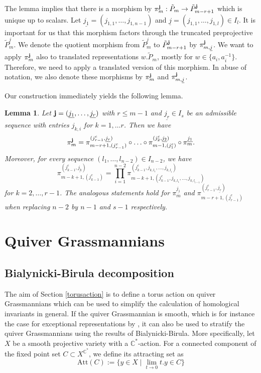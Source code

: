 \documentclass{amsart}
\newtheorem{lemma}[theorem]{Lemma}
\numberwithin{equation}{section}
\newcommand{\C}{\mathbb{C}}
\newcommand{\uj}{{\underline j}}
\begin{document}
The lemma implies that there is a morphism by $\pi_m^{\bf j}:\tilde P_m\to \tilde P_{m-r+1}^{\bf j}$ which is unique up to scalars. Let $\underline{j_1}=(j_{1,1},\ldots,j_{1,n-1})$ and $\uj=(j_{1,1},\ldots,j_{1,l})\in I_l$. It is important for us that this morphism factors through the truncated preprojective $\tilde P_m^{\uj}$. We denote the quotient morphism from $\tilde P_m^{\uj}$ to $\tilde P_{m-r+1}^{\bf j}$ by $\pi_{m,\uj}^{\bf j}$. We want to apply $\pi_m^{\bf j}$ also to translated representations $w.\tilde P_m$, mostly for $w\in\{a_i,a_i^{-1}\}$. Therefore, we need to apply a translated version of this morphism. In abuse of notation, we also denote these morphisms by $\pi_m^{\bf j}$ and $\pi_{m,\uj}^{\bf j}$.

Our construction immediately yields the following lemma.
\begin{lemma}\label{projections}
Let ${\bf j}=(\underline{j_1},\ldots,\underline{j_r})$ with $r\leq m-1$ and $\underline{j_r}\in I_s$ be an admissible sequence with entries $j_{k,i}$ for $k=1,\ldots r$. Then we have
\[\pi_m^{\bf j}=\pi_{m-r+1,(j_{r-1}^c)}^{(j_{r-1}^c,\underline{j_r})}\circ\ldots\circ\pi^{(j_{2}^c,\underline{j_2})}_{m-1,(j_1^c)}\circ\pi_m^{\underline{j_1}}.\]
Moreover, for every sequence $(l_1,\ldots,l_{n-2})\in I_{n-2}$, we have
\[\pi_{m-k+1,(j_{k-1}^c)}^{(j_{k-1}^c,\underline{j_k})}=\prod_{i=1}^{n-2} \pi^{(j_{k-1}^c,j_{k,l_1},\ldots, j_{k,l_{i}})}_{m-k+1,(j_{k-1}^c,j_{k,l_1},\ldots,j_{k,l_{i-1}})}\]
for $k=2,\ldots,r-1$. The analogous statements hold for $\pi_m^{\underline{j_1}}$ and  $\pi_{m-r+1,(j_{r-1}^c)}^{(j_{r-1}^c,\underline{j_r})}$ when replacing $n-2$ by $n-1$ and $s-1$ respectively.
\end{lemma}

\section{Quiver Grassmannians}
\label{QG}

\subsection{Bialynicki-Birula decomposition}
The aim of Section \ref{torusaction} is to define a torus action on quiver Grassmannians which can be used to simplify the calculation of homological invariants in general.
If the quiver Grassmannian is smooth, which is for instance the case for exceptional representations by \cite{cr}, it can also be used to stratify the quiver Grassmannians using the results of Bialynicki-Birula.
More specifically, let $X$ be a smooth projective variety with a $\C^\ast$-action.
For a connected component of the fixed point set $C\subset X^{\C^\ast}$, we define its attracting set as
\[
  \mathrm{Att}(C):=\{y\in X\mid \lim_{t\to 0}t.y\in C\}
\]
\end{document}
